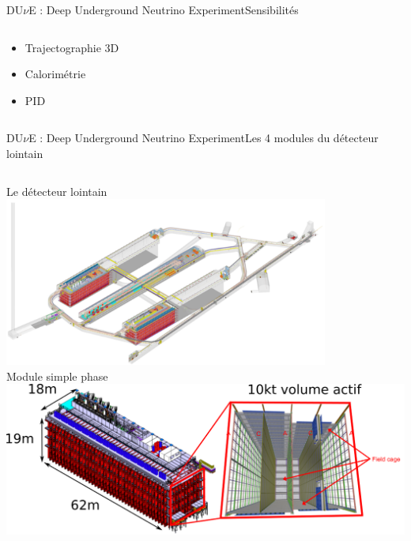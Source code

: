 \begin{frame}{DU$\nu$E : Deep Underground Neutrino Experiment}{Sensibilités}
\begin{scriptsize}
\begin{columns}
\begin{column}{0.4\textwidth}
                    \begin{itemize}
                        \item Trajectographie 3D
                        \item Calorimétrie
                        \item PID
                    \end{itemize}
                \end{column}
            \end{columns}
        \end{scriptsize}
    \end{frame}

    \begin{frame}{DU$\nu$E : Deep Underground Neutrino Experiment}{Les 4 modules du détecteur lointain}
        \begin{scriptsize}
            \begin{columns}
                \begin{column}{0.55\textwidth}
                    \centering Le détecteur lointain\\
                    \includegraphics[width=0.8\textwidth]{./pictures/FD.png}\\
                    \centering Module simple phase\\
                    \includegraphics[width=\textwidth]{./pictures/module_SP.png}\\

\end{column}
\end{columns}
\end{scriptsize}
\end{frame}
